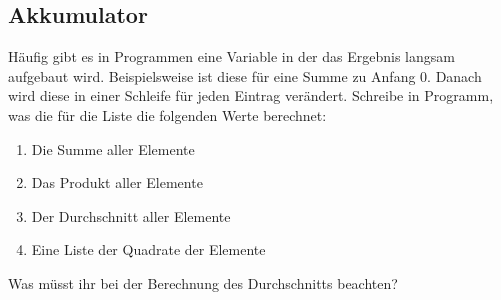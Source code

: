 \subsection{Akkumulator }

Häufig gibt es in Programmen eine Variable in der das Ergebnis langsam aufgebaut
wird. Beispielsweise ist diese für eine Summe zu Anfang $0$. Danach wird diese
in einer Schleife für jeden Eintrag verändert. Schreibe in Programm, was die
für die Liste \pythoninline{[1,2,3,4,5,6,7]} die folgenden Werte berechnet:

\begin{enumerate}
    \item Die Summe aller Elemente
    \item Das Produkt aller Elemente
    \item Der Durchschnitt aller Elemente
    \item Eine Liste der Quadrate der Elemente
\end{enumerate}

Was müsst ihr bei der Berechnung des Durchschnitts beachten?
